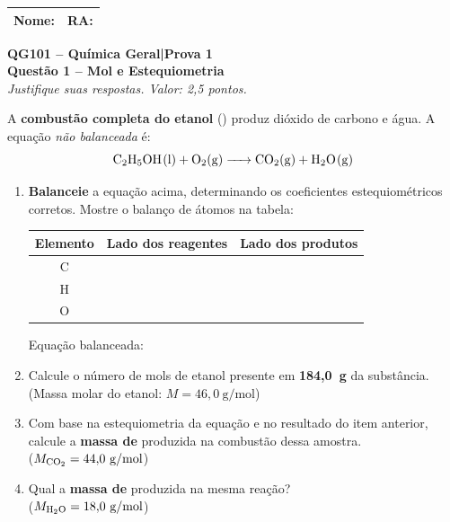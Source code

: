 \documentclass[10pt,a4paper]{article}
\newcommand{\nomera}{%
  \noindent
  \begin{tabular}{|p{0.65\textwidth}|p{0.28\textwidth}|}
    \rule{0pt}{1.8em}Nome:\hfill & RA:\hfill\rule{0pt}{1.8em} \\
    \hline
  \end{tabular}%
  \vspace{0.4cm}
}
\newcommand{\cabecalho}[1]{%
  \begin{center}
    {\large\bfseries QG101 -- Química Geral\quad|\quad Prova 1}\\[2pt]
    {\bfseries #1}\\[2pt]
    \textit{Justifique suas respostas. Valor: 2,5 pontos.}
  \end{center}
  \vspace{0.2cm}
}
\begin{document}
\nomera
\cabecalho{Questão 1 -- Mol e Estequiometria}

A \textbf{combustão completa do etanol} () produz dióxido
de carbono e água. A equação \emph{não balanceada} é:
\[
  \ce{C2H5OH(l) + O2(g) -> CO2(g) + H2O(g)}
\]

\begin{enumerate}[label=\textbf{\alph*)}]

  \item \textbf{Balanceie} a equação acima, determinando os coeficientes
        estequiométricos corretos. Mostre o balanço de átomos na tabela:

        \begin{center}
        \renewcommand{\arraystretch}{1.6}
        \begin{tabular}{|c|c|c|}
          \hline
          \textbf{Elemento} & \textbf{Lado dos reagentes} & \textbf{Lado dos produtos} \\
          \hline
          C & \hspace{2cm} & \hspace{2cm} \\
          \hline
          H & & \\
          \hline
          O & & \\
          \hline
        \end{tabular}
        \end{center}

        Equação balanceada: \quad

        \vspace{0.3cm}

  \item Calcule o número de mols de etanol presente em \textbf{184,0~g}
        da substância.\\
        (Massa molar do etanol: $M = 46{,}0~\text{g/mol}$)

        \vspace{3.5cm}

  \item Com base na estequiometria da equação e no resultado do item
        anterior, calcule a \textbf{massa de } produzida na combustão dessa amostra.\\
        ($M_{\ce{CO2}} = 44{,}0~\text{g/mol}$)

        \vspace{3.5cm}

  \item Qual a \textbf{massa de } produzida na mesma reação?\\
        ($M_{\ce{H2O}} = 18{,}0~\text{g/mol}$)

        \vspace{3cm}

\end{enumerate}
\end{document}
